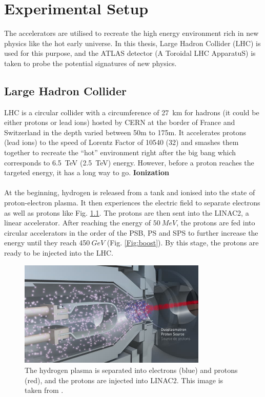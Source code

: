 \chapter{Experimental Setup}
\label{chap:exp}
The accelerators are utilised to recreate the high energy environment rich in new physics like the hot early universe. In this thesis, Large Hadron Collider (LHC) is used for this purpose, and the ATLAS detector (A Toroidal LHC ApparatuS) is taken to probe the potential signatures of new physics. 
\section{Large Hadron Collider\cite{LHC}}
LHC is a circular collider with a circumference of 27~km for hadrons (it could be either protons or lead ions) hosted by CERN at the border of France and Switzerland in the depth varied between 50m to 175m. It accelerates protons (lead ions) to the speed of Lorentz Factor of 10540 (32) and smashes them together to recreate the ``hot'' environment right after the big bang which corresponds to 6.5~TeV (2.5~TeV) energy. However, before a proton reaches the targeted energy, it has a long way to go.
\newpage
\noindent
{\bf Ionization}
\\
\\At the beginning, hydrogen is released from a tank and ionised into the state of proton-electron plasma. It then experiences the electric field to separate electrons as well as protons like Fig. \ref{Fig:ionization}. The protons are then sent into the LINAC2, a linear accelerator. After reaching the energy of $50~MeV$, the protons are fed into circular accelerators in the order of the PSB, PS and SPS to further increase the energy until they reach 450$~GeV$ (Fig. \ref{Fig:boost}). By this stage, the protons are ready to be injected into the LHC.
\begin{figure}[!h]                
	\includegraphics[width=0.8\textwidth]{Chapter2/ionization.png}
	\centering
	\begin{center}
		\caption{The hydrogen plasma is separated into electrons (blue) and protons (red), and the protons are injected into LINAC2. This image is taken from \cite{Ionization}.}
		\label{Fig:ionization}            
	\end{center}
\end{figure}
